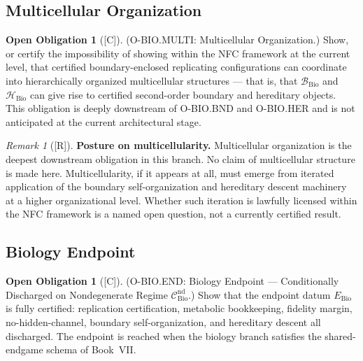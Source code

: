 \documentclass[12pt,oneside]{amsbook}
\theoremstyle{plain}
\theoremstyle{definition}
\newtheorem{obligation}[theorem]{Open Obligation}
\theoremstyle{remark}
\newtheorem{remark}[theorem]{Remark}
\newcommand{\status}[1]{\textup{[#1]}}
\begin{document}
\subsection{Multicellular Organization}\label{sec:bio-MULTI}

\begin{obligation}[\status{C}]\label{ob:bio-MULTI}
\textup{(O-BIO.MULTI: Multicellular Organization.)}
Show, or certify the impossibility of showing within the NFC
framework at the current level, that certified boundary-enclosed
replicating configurations can coordinate into hierarchically
organized multicellular structures --- that is, that
$\mathcal{B}_{\mathrm{Bio}}$ and $\mathcal{H}_{\mathrm{Bio}}$ can
give rise to certified second-order boundary and hereditary objects.
This obligation is deeply downstream of O-BIO.BND and O-BIO.HER and
is not anticipated at the current architectural stage.
\end{obligation}

\begin{remark}[\status{R}]\label{rem:bio-multi-posture}
\textbf{Posture on multicellularity.}
Multicellular organization is the deepest downstream obligation in
this branch. No claim of multicellular structure is made here.
Multicellularity, if it appears at all, must emerge from iterated
application of the boundary self-organization and hereditary descent
machinery at a higher organizational level. Whether such iteration
is lawfully licensed within the NFC framework is a named open
question, not a currently certified result.
\end{remark}

\subsection{Biology Endpoint}\label{sec:bio-END}

\begin{obligation}[\status{C}]\label{ob:bio-END}
\textup{(O-BIO.END: Biology Endpoint --- Conditionally Discharged on Nondegenerate Regime $\mathcal{C}^{\mathrm{nd}}_{\mathrm{Bio}}$.)}
Show that the endpoint datum $E_{\mathrm{Bio}}$ is fully certified:
replication certification, metabolic bookkeeping, fidelity margin,
no-hidden-channel, boundary self-organization, and hereditary descent
all discharged. The endpoint is reached when the biology branch
satisfies the shared-endgame schema of Book~VII.
\end{obligation}
\end{document}

